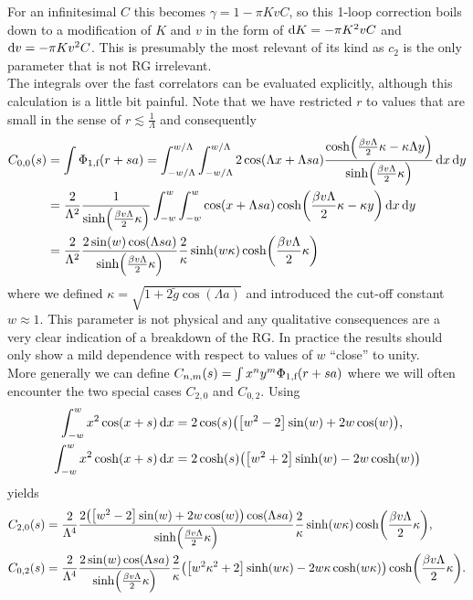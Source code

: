 \documentclass[english, parskip=full]{scrartcl}
\begin{document}
For an infinitesimal $C$ this becomes $\gamma = 1 - \pi KvC$, so this 1-loop correction boils down to a modification of $K$ and $v$ in the form of $\text{d} K = -\pi K^2vC$ and $\text{d} v = -\pi Kv^2C$.
This is presumably the most relevant of its kind as $c_2$ is the only parameter that is not RG irrelevant.\\
The integrals over the fast correlators can be evaluated explicitly, although this calculation is a little bit painful.
Note that we have restricted $r$ to values that are small in the sense of $r\lesssim \frac{1}{\Lambda}$ and consequently
\begin{align}
C_{0,0}(s) &= \int \Phi_{1,\f}(r+sa) = \intx{-w/\Lambda}{w/\Lambda}{\intx{-w/\Lambda}{w/\Lambda}{2\cos\kla*{\Lambda x + \Lambda sa} \frac{\cosh\kla*{\frac{\beta v\Lambda}{2} \kappa - \kappa \Lambda y}}{\sinh\kla*{\frac{\beta v\Lambda}{2} \kappa}}}{x}}{y}\\
&= \frac{2}{\Lambda^2} \frac{1}{\sinh\kla*{\frac{\beta v\Lambda}{2} \kappa}}\intx{-w}{w}{\intx{-w}{w}{\cos\kla*{x + \Lambda sa} \cosh\kla*{\frac{\beta v\Lambda}{2} \kappa - \kappa y}}{x}}{y}\\
&= \frac{2}{\Lambda^2} \frac{2\sin(w) \cos(\Lambda sa)}{ \sinh\kla*{\frac{\beta v\Lambda}{2} \kappa}} \frac{2}{\kappa} \sinh\kla*{w\kappa} \cosh\kla*{\frac{\beta v\Lambda}{2} \kappa}
\end{align}
where we defined $\kappa = \sqrt{1 + 2\tilde{g}\cos(\Lambda a)}$ and introduced the cut-off constant $w\approx 1$.
This parameter is not physical and any qualitative consequences are a very clear indication of a breakdown of the RG.
In practice the results should only show a mild dependence with respect to values of $w$ ``close'' to unity.\\
More generally we can define $C_{n,m}(s) = \int x^n y^m \Phi_{1,\text{f}}(r+sa)$ where we will often encounter the two special cases $C_{2,0}$ and $C_{0,2}$.
Using
\begin{align}
\intx{-w}{w}{x^2\cos\kla*{x + s}}{x} &= 2\cos(s) \kla*{ \klb*{w^2-2}\sin(w) + 2w\cos(w)},\\
\intx{-w}{w}{x^2\cosh\kla*{x + s}}{x} &= 2\cosh(s)\kla*{\klb*{w^2+2} \sinh(w) - 2w\cosh(w)}
\end{align}
yields
\begin{align}
C_{2,0}(s) &= \frac{2}{\Lambda^4} \frac{2\kla*{ \klb*{w^2-2}\sin(w) + 2w\cos(w)} \cos(\Lambda sa)}{ \sinh\kla*{\frac{\beta v\Lambda}{2} \kappa}} \frac{2}{\kappa} \sinh\kla*{w\kappa} \cosh\kla*{\frac{\beta v\Lambda}{2} \kappa},\\
C_{0,2}(s) &= \frac{2}{\Lambda^4} \frac{2\sin(w) \cos(\Lambda sa)}{ \sinh\kla*{\frac{\beta v\Lambda}{2} \kappa}} \frac{2}{\kappa} \kla*{\klb*{w^2\kappa^2+2} \sinh(w\kappa) - 2w\kappa\cosh(w\kappa)} \cosh\kla*{\frac{\beta v\Lambda}{2} \kappa}.
\end{align}
\end{document}
